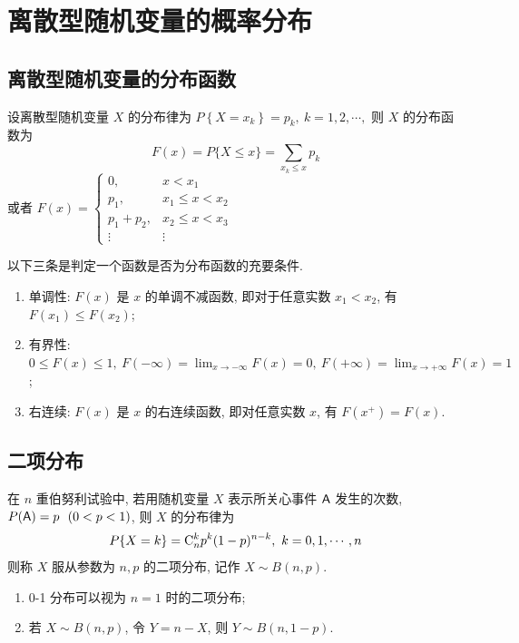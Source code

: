 \section{离散型随机变量的概率分布}

\subsection{离散型随机变量的分布函数}

\begin{definition}[分布函数]
    设离散型随机变量 $ X $ 的分布律为
    $P\left\{X=x_{k}\right\}=p_{k},~k=1,2, \cdots,$ 则 $ X $ 的分布函数为
    $$F(x)=P\{X \leqslant x\}=\sum_{x_{k} \leqslant x} p_{k}$$
    或者
    $F(x)=\begin{cases}
            0,           & x<x_{1}                 \\
            p_{1},       & x_{1} \leqslant x<x_{2} \\
            p_{1}+p_{2}, & x_{2} \leqslant x<x_{3} \\
            \vdots       & \vdots
        \end{cases}$
\end{definition}

\begin{theorem}[分布函数的性质]
    以下三条是判定一个函数是否为分布函数的充要条件.
    \begin{enumerate}[label=(\arabic{*})]
        \item 单调性: $F(x) $ 是 $ x $ 的单调不减函数, 即对于任意实数 $ x_{1}<x_{2}$, 有 $ F\left(x_{1}\right) \leqslant F\left(x_{2}\right) $;
        \item 有界性: $\displaystyle0 \leqslant F(x) \leqslant 1 ,~F(-\infty)=\lim _{x \to-\infty} F(x)=0,~F(+\infty)=\lim_{x\to+\infty}F(x)=1$;
        \item 右连续: $F(x)$ 是 $x$ 的右连续函数, 即对任意实数 $x$, 有 $F(x^+)=F(x).$
    \end{enumerate}
\end{theorem}

\subsection{二项分布}

\begin{definition}[二项分布]
    在 $ n $ 重伯努利试验中, 若用随机变量 $ X $ 表示所关心事件 $ \mathsf{A} $ 发生的次数, $P(\mathsf{A})=p~~(0<p<1)$, 则 $ X $ 的分布律为
    $$P\{X=k\}=\mathrm{C}_{n}^{k} p^{k}(1-p)^{n-k}, ~k=0,1, \cdots, n$$
    则称 $ X $ 服从参数为 $ n, p $ 的二项分布, 记作 $ X \sim B(n, p) $.
    \begin{enumerate}[label=(\arabic{*})]
        \item 0-1 分布可以视为 $ n=1 $ 时的二项分布;
        \item 若 $ X \sim B(n, p) $, 令 $ Y=n-X$, 则 $ Y \sim B(n, 1-p) .$
    \end{enumerate}
\end{definition}

